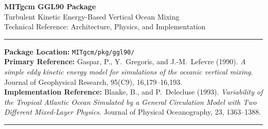 \documentclass[12pt,letterpaper]{article}
\begin{document}

\begin{titlepage}
\begin{center}
\vspace*{2cm}

{\Huge\color{sectioncolor}\bfseries MITgcm GGL90 Package}\\[0.5cm]
{\Large\color{fortranblue} Turbulent Kinetic Energy-Based Vertical Ocean Mixing}\\[0.5cm]
{\large\color{gray} Technical Reference: Architecture, Physics, and Implementation}

\vspace{1.5cm}
\rule{\linewidth}{2pt}
\vspace{0.5cm}

\begin{infobox}
\textbf{Package Location:} \texttt{MITgcm/pkg/ggl90/}\\[4pt]
\textbf{Primary Reference:} Gaspar, P., Y.\ Gregoris, and J.-M.\ Lefevre (1990).
\textit{A simple eddy kinetic energy model for simulations of the oceanic vertical mixing}.
Journal of Geophysical Research, 95(C9), 16,179--16,193.\\[4pt]
\textbf{Implementation Reference:} Blanke, B., and P.\ Delecluse (1993).
\textit{Variability of the Tropical Atlantic Ocean Simulated by a General Circulation Model
with Two Different Mixed-Layer Physics}. Journal of Physical Oceanography, 23, 1363--1388.
\end{infobox}

\vspace{1cm}
\rule{\linewidth}{1pt}
\vspace{0.5cm}


\end{center}
\end{titlepage}
\end{document}
